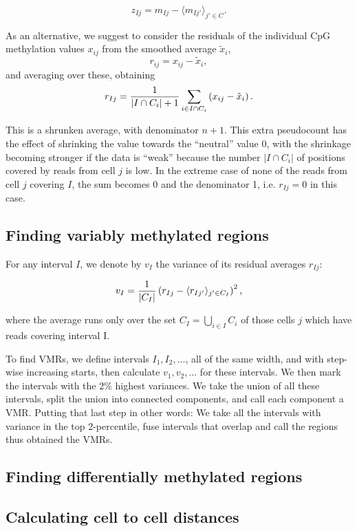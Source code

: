 \documentclass[twocolumn,10pt]{article}
\begin{document}
$$ z_{Ij} = m_{Ij} - \langle m_{Ij'}\rangle_{j'\in C}.$$

As an alternative, we suggest to consider the residuals of the individual CpG methylation values $x_{ij}$ from the smoothed average $\tilde x_i$,
$$ r_{ij} = x_{ij} - \tilde x_i, $$
and averaging over these, obtaining
\begin{equation} 
r_{Ij} = \frac{\scriptsize{1}}{\scriptsize{|I\cap C_i|+1}}\sum_{i\in I\cap C_i}\left( x_{ij} - \tilde x_i \right).
\label{avgres}
\end{equation}

This is a shrunken average, with denominator $n+1$.
This extra pseudocount has the effect of shrinking the value towards the ``neutral'' value 0, with the shrinkage becoming stronger if the data is ``weak'' because the number $|I\cap C_i|$ of positions covered by reads from cell $j$  is low.
In the extreme case of none of the reads from cell $j$ covering $I$, the sum becomes 0 and the denominator 1, i.e.
$r_{Ij}=0$ in this case.

\subsection{Finding variably methylated regions}

For any interval $I$, we denote by $v_I$ the variance of its residual averages $r_{Ij}$:

$$ v_I = \frac{\scriptsize{1}}{\scriptsize{|C_I|}}\left( r_{Ij} - \langle r_{Ij'}\rangle_{j'\in C_I} \right)^2,$$

where the average runs only over the set $C_I=\bigcup_{i\in I}C_i$ of those cells $j$ which have reads covering interval I.

To find VMRs, we define intervals $I_1, I_2, ...$, all of the same width, and with step-wise increasing starts, then calculate $v_1, v_2, ...$ for these intervals.
We then mark the intervals with the 2\% highest variances.
We take the union of all these intervals, split the union into connected components, and call each component a VMR.
Putting that last step in other words: We take all the intervals with variance in the top 2-percentile, fuse intervals that overlap and call the regions thus obtained the VMRs.

\subsection{Finding differentially methylated regions}

\subsection{Calculating cell to cell distances}
\end{document}
